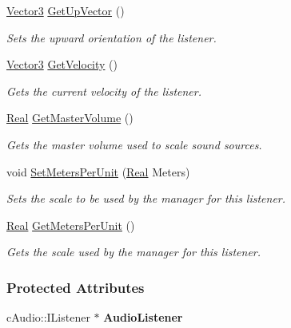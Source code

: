 \begin{DoxyCompactItemize}
\hyperlink{classphys_1_1Vector3}{Vector3} \hyperlink{classphys_1_1SoundListener_aff27f90cad8b2eec53e28d28ee2203c3}{GetUpVector} ()
\begin{DoxyCompactList}\small\item\em Sets the upward orientation of the listener. \item\end{DoxyCompactList}\item 
\hyperlink{classphys_1_1Vector3}{Vector3} \hyperlink{classphys_1_1SoundListener_a6b4bbf974c48ba2028bcf2f943a1b1c2}{GetVelocity} ()
\begin{DoxyCompactList}\small\item\em Gets the current velocity of the listener. \item\end{DoxyCompactList}\item 
\hyperlink{namespacephys_af7eb897198d265b8e868f45240230d5f}{Real} \hyperlink{classphys_1_1SoundListener_a03acbadb9e7ebad0014269bf5c3bcf3d}{GetMasterVolume} ()
\begin{DoxyCompactList}\small\item\em Gets the master volume used to scale sound sources. \item\end{DoxyCompactList}\item 
void \hyperlink{classphys_1_1SoundListener_ae5d432f4e1bf7eb788364e7ea0c4e0a6}{SetMetersPerUnit} (\hyperlink{namespacephys_af7eb897198d265b8e868f45240230d5f}{Real} Meters)
\begin{DoxyCompactList}\small\item\em Sets the scale to be used by the manager for this listener. \item\end{DoxyCompactList}\item 
\hyperlink{namespacephys_af7eb897198d265b8e868f45240230d5f}{Real} \hyperlink{classphys_1_1SoundListener_a97c834a1b8fec9ce3a0e705468d531e5}{GetMetersPerUnit} ()
\begin{DoxyCompactList}\small\item\em Gets the scale used by the manager for this listener. \item\end{DoxyCompactList}\end{DoxyCompactItemize}
\subsubsection*{Protected Attributes}
\begin{DoxyCompactItemize}
\item 
\hypertarget{classphys_1_1SoundListener_ada88acce2006736a00c8eb3a428a3e42}{
cAudio::IListener $\ast$ {\bfseries AudioListener}}
\label{d1/d5a/classphys_1_1SoundListener_ada88acce2006736a00c8eb3a428a3e42}

\end{DoxyCompactItemize}


